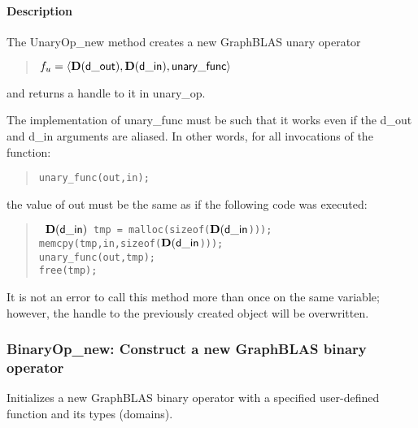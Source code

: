 \paragraph{Description}

\newenvironment{code}{\tt}{}

The {\sf UnaryOp\_new} method creates a new GraphBLAS unary operator
\begin{quote}
$f_u = \langle \mathbf{D}({\sf d\_out}), \mathbf{D}({\sf d\_in}), {\sf unary\_func} \rangle$
\end{quote}
and returns a handle to it in {\sf unary\_op}.

The implementation of {\sf unary\_func} must be such that it works
even if the {\sf d\_out} and {\sf d\_in} arguments are aliased.
In other words, for all invocations of the function:
\begin{quote}
\begin{verbatim}
unary_func(out,in);
\end{verbatim}
\end{quote}
the value of {\sf out} must be the same as if the following code
was executed:

\begin{quote}
\begin{code}
    $\mathbf{D}({\sf d\_in})$ tmp = malloc(sizeof($\mathbf{D}({\sf d\_in}$))); \\
    memcpy(tmp,in,sizeof($\mathbf{D}({\sf d\_in}$))); \\
    unary\_func(out,tmp); \\
    free(tmp);
\end{code}
\end{quote}

It is not an error to call this method more than once on the same variable;  
however, the handle to the previously created object will be overwritten. 


\subsubsection{{\sf BinaryOp\_new}: Construct a new GraphBLAS binary operator}

Initializes a new GraphBLAS binary operator with a specified user-defined 
function and its types (domains).

\paragraph{\syntax}

